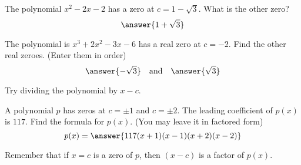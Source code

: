 \documentclass{ximera}
\author{Carl Stitz \and Jeff Zeager \and  Bobby Ramsey}
\begin{document}
\begin{exercise}
	The polynomial $x^2 - 2x - 2$ has a zero at $\displaystyle c = 1-\sqrt{3}$.  What is the other zero?
	\[ \answer{1+\sqrt{3}} \]
\end{exercise}

\begin{exercise}
	The polynomial is $\displaystyle x^3	+ 2x^2-3x-6$ has a real zero at $c = -2$.  Find the other real zeroes. (Enter them in order)
	\[ \answer{-\sqrt{3}}  \quad \text{and} \quad \answer{\sqrt{3}} \]
	\begin{feedback}
		Try dividing the polynomial by $x-c$.  
	\end{feedback}
\end{exercise}

\begin{exercise}
	A polynomial $p$ has zeros at $c=\pm 1$ and $c = \pm 2$.  The leading coefficient of $p(x)$ is $117$.  Find the formula for $p(x)$. (You may leave it in factored form)
	\[ p(x) = \answer{117(x+1)(x-1)(x+2)(x-2)} \]
	\begin{feedback}
		Remember that if $x=c$ is a zero of $p$, then $(x-c)$ is a factor of $p(x)$.
	\end{feedback}
\end{exercise}
\end{document}

